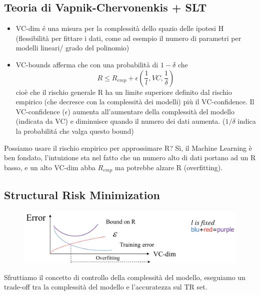 \documentclass{article}
\begin{document}
\subsection{Teoria di Vapnik-Chervonenkis + SLT}
\begin{itemize}
    \item VC-dim é una misura per la complessità dello spazio delle ipotesi H (flessibilità per fittare i dati, come ad esempio il numero di parametri per modelli lineari/ grado del polinomio)
    \item VC-bounds afferma che con una probabilità di $1-\delta$ che \[ R \leq R_{emp} + \epsilon(\frac{1}{l},VC,\frac{1}{\delta})\]
    cioè che il rischio generale R ha un limite superiore definito dal rischio empirico (che decresce con la complessità dei modelli) più il VC-confidence. Il VC-confidence ($\epsilon$) aumenta all'aumentare della complessità del modello (indicata da VC) e diminuisce quando il numero dei dati aumenta. ($1/\delta$ indica la probabilitá che valga questo bound)
\end{itemize}
Possiamo usare il rischio empirico per approssimare R? Sì, il Machine Learning è ben fondato, l'intuizione sta nel fatto che un numero alto di dati portano ad un R basso, e un alto VC-dim abba $R_{emp}$ ma potrebbe alzare R (overfitting).
\subsection{Structural Risk Minimization}
\begin{figure}[H]
\centering
\includegraphics[scale=0.4]{Images/structuralriskmin.png}
\end{figure}
Sfruttiamo il concetto di controllo della complessità del modello, eseguiamo un trade-off tra la complessità del modello e l'accuratezza sul TR set.
\end{document}
